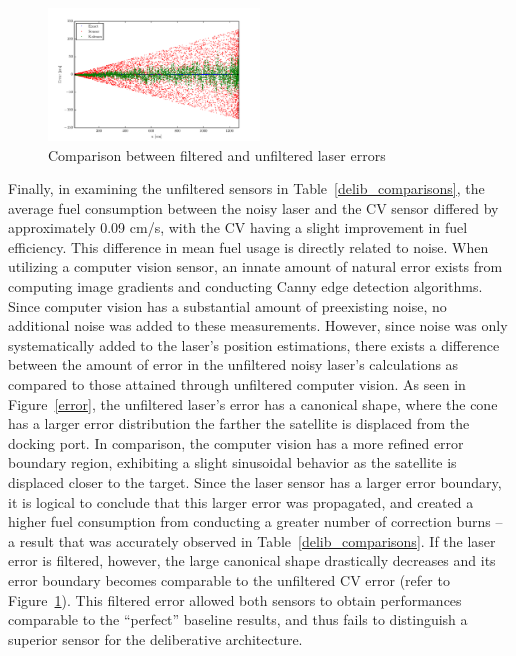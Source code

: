 \documentclass[journal, 10pt]{IEEEtran}
\begin{document}
\begin{figure}
\begin{center}
\includegraphics[width=0.5\textwidth]{figures/lasererror.pdf}
\caption{Comparison between filtered and unfiltered laser errors}
\label{laser_error}
\end{center}
\end{figure}

Finally, in examining the unfiltered sensors in Table~\ref{delib_comparisons}, the average fuel consumption between the noisy laser and the CV sensor differed by approximately 0.09 cm/s, with the CV having a slight improvement in fuel efficiency. This difference in mean fuel usage is directly related to noise. When utilizing a computer vision sensor, an innate amount of natural error exists from computing image gradients and conducting Canny edge detection algorithms. Since computer vision has a substantial amount of preexisting noise, no additional noise was added to these measurements. However, since noise was only systematically added to the laser's position estimations, there exists a difference between the amount of error in the unfiltered noisy laser's calculations as compared to those attained through unfiltered computer vision. As seen in Figure~\ref{error}, the unfiltered laser's error has a canonical shape, where the cone has a larger error distribution the farther the satellite is displaced from the docking port. In comparison, the computer vision has a more refined error boundary region, exhibiting a slight sinusoidal behavior as the satellite is displaced closer to the target. Since the laser sensor has a larger error boundary, it is logical to conclude that this larger error was propagated, and created a higher fuel consumption from conducting a greater number of correction burns -- a result that was accurately observed in Table~\ref{delib_comparisons}. If the laser error is filtered, however, the large canonical shape drastically decreases and its error boundary becomes comparable to the unfiltered CV error (refer to Figure~\ref{laser_error}). This filtered error allowed both sensors to obtain performances comparable to the ``perfect'' baseline results, and thus fails to distinguish a superior sensor for the deliberative architecture.
\end{document}
